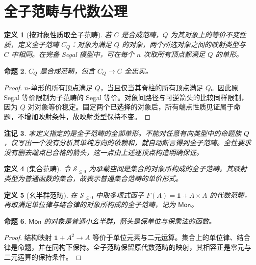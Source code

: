 \documentclass[12pt,oneside,openany,fontset=none]{ctexbook}
\theoremstyle{cn}
\newtheorem{definition}{定义}[chapter]
\newtheorem{proposition}[definition]{命题}
\newtheorem{remark}[definition]{注记}
\numberwithin{equation}{chapter}
\newcommand{\Sp}{\mathcal S}
\newcommand{\Mon}{\mathsf{Mon}}
\newcommand{\one}{\mathbf 1}
\begin{document}
\section{全子范畴与代数公理}
\begin{definition}[按对象性质取全子范畴]
若 $C$ 是合成范畴，$Q$ 为其对象上的等价不变性质，定义全子范畴 $C_Q$：对象为满足 $Q$ 的对象，两个所选对象之间的映射类型与 $C$ 中相同。在完备 Segal 模型中，可在每个 $n$ 次取所有顶点都满足 $Q$ 的单形。
\end{definition}
\begin{proposition}
$C_Q$ 是合成范畴，包含 $C_Q\to C$ 全忠实。
\end{proposition}
\begin{proof}
$n$-单形的所有顶点满足 $Q$，当且仅当其脊柱的所有顶点满足 $Q$。因此原 Segal 等价限制为子范畴的 Segal 等价。对象间路径与可逆箭头的比较同样限制，因为 $Q$ 对对象等价稳定。固定两个已选择的对象后，所有端点性质见证属于命题，不增加映射条件，故映射类型保持不变。
\end{proof}
\begin{remark}
本定义指定的是全子范畴的全部单形。不能对任意有向类型中的命题族 $Q$，仅写出一个没有分析其单纯方向的依赖和，就自动断言得到全子范畴。全性要求没有删去端点已合格的箭头，这一点由上述逐顶点构造明确保证。
\end{remark}
\begin{definition}[集合范畴]
令 $\Sp_{\le0}$ 为承载空间是集合的对象所构成的全子范畴。其映射类型为普通函数的集合，故表示普通集合范畴的单价形式。
\end{definition}
\begin{definition}[幺半群范畴]
在 $\Sp_{\le0}$ 中取多项式函子 $F(A)=\one+A\times A$ 的代数范畴，再取满足单位律与结合律的对象所构成的全子范畴，记为 $\Mon$。
\end{definition}
\begin{proposition}
$\Mon$ 的对象是普通小幺半群，箭头是保单位与保乘法的函数。
\end{proposition}
\begin{proof}
结构映射 $\one+A^2\to A$ 等价于单位元素与二元运算。集合上的单位律、结合律是命题，并在同构下保持。全子范畴保留原代数范畴的映射，其相容正是零元与二元运算的保持条件。
\end{proof}
\end{document}
